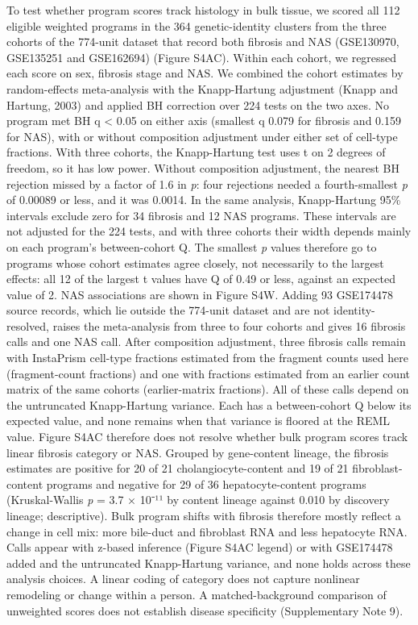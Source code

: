To test whether program scores track histology in bulk tissue, we scored all 112 eligible weighted programs in the 364 genetic-identity clusters from the three cohorts of the 774-unit dataset that record both fibrosis and NAS (GSE130970, GSE135251 and GSE162694) (Figure S4AC). Within each cohort, we regressed each score on sex, fibrosis stage and NAS. We combined the cohort estimates by random-effects meta-analysis with the Knapp-Hartung adjustment (Knapp and Hartung, 2003) and applied BH correction over 224 tests on the two axes. No program met BH q \textless{} 0.05 on either axis (smallest q 0.079 for fibrosis and 0.159 for NAS), with or without composition adjustment under either set of cell-type fractions. With three cohorts, the Knapp-Hartung test uses t on 2 degrees of freedom, so it has low power. Without composition adjustment, the nearest BH rejection missed by a factor of 1.6 in \emph{p}: four rejections needed a fourth-smallest \emph{p} of 0.00089 or less, and it was 0.0014. In the same analysis, Knapp-Hartung 95\% intervals exclude zero for 34 fibrosis and 12 NAS programs. These intervals are not adjusted for the 224 tests, and with three cohorts their width depends mainly on each program's between-cohort Q. The smallest \emph{p} values therefore go to programs whose cohort estimates agree closely, not necessarily to the largest effects: all 12 of the largest \textbar t\textbar{} values have Q of 0.49 or less, against an expected value of 2. NAS associations are shown in Figure S4W. Adding 93 GSE174478 source records, which lie outside the 774-unit dataset and are not identity-resolved, raises the meta-analysis from three to four cohorts and gives 16 fibrosis calls and one NAS call. After composition adjustment, three fibrosis calls remain with InstaPrism cell-type fractions estimated from the fragment counts used here (fragment-count fractions) and one with fractions estimated from an earlier count matrix of the same cohorts (earlier-matrix fractions). All of these calls depend on the untruncated Knapp-Hartung variance. Each has a between-cohort Q below its expected value, and none remains when that variance is floored at the REML value. Figure S4AC therefore does not resolve whether bulk program scores track linear fibrosis category or NAS. Grouped by gene-content lineage, the fibrosis estimates are positive for 20 of 21 cholangiocyte-content and 19 of 21 fibroblast-content programs and negative for 29 of 36 hepatocyte-content programs (Kruskal-Wallis \emph{p} = 3.7 × 10⁻¹¹ by content lineage against 0.010 by discovery lineage; descriptive). Bulk program shifts with fibrosis therefore mostly reflect a change in cell mix: more bile-duct and fibroblast RNA and less hepatocyte RNA. Calls appear with z-based inference (Figure S4AC legend) or with GSE174478 added and the untruncated Knapp-Hartung variance, and none holds across these analysis choices. A linear coding of category does not capture nonlinear remodeling or change within a person. A matched-background comparison of unweighted scores does not establish disease specificity (Supplementary Note 9).


